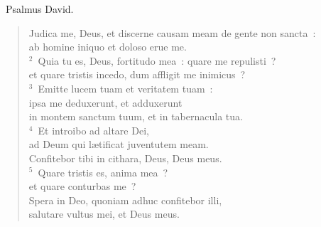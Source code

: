 ~\lettrine[lines=10,image=true,loversize=0.05,lraise=-0.03]{P}{}salmus David. \begin{flushleft}\begin{verse}\vspace{6pt}Judica me, Deus, et discerne causam meam de gente non sancta~:\\ ab homine iniquo et doloso erue me.\\
${}^{2}$~Quia tu es, Deus, fortitudo mea~: quare me repulisti~?\\ et quare tristis incedo, dum affligit me inimicus~?\\
${}^{3}$~Emitte lucem tuam et veritatem tuam~:\\ ipsa me deduxerunt, et adduxerunt\\ in montem sanctum tuum, et in tabernacula tua.\\
${}^{4}$~Et introibo ad altare Dei,\\ ad Deum qui l\ae tificat juventutem meam.\\ Confitebor tibi in cithara, Deus, Deus meus.\\
${}^{5}$~Quare tristis es, anima mea~?\\ et quare conturbas me~?\\ Spera in Deo, quoniam adhuc confitebor illi,\\ salutare vultus mei, et Deus meus.\end{verse}\end{flushleft}


